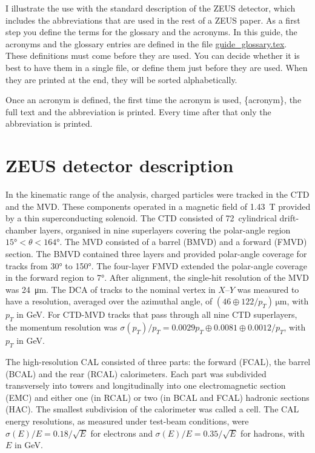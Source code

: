 I illustrate the use with the standard description of the ZEUS
detector, which includes the abbreviations that are used in the rest
of a ZEUS paper.  As a first step you define the terms for the
glossary and the acronyms.  In this guide, the acronyms and the
glossary entries are defined in the file
\url{guide_glossary.tex}. These definitions must come before
they are used. You can decide whether it is best to have them in a
single file, or define them just before they are used. When they are
printed at the end, they will be sorted alphabetically.

Once an acronym is defined, the first time the acronym is used,
\{acronym\}, the full text and the abbreviation is
printed. Every time after that only the abbreviation is printed.

\section{ZEUS detector description}
\label{sec:app:glossary:zeus}

In the kinematic range of the analysis, charged particles were tracked
in the \gls{CTD} and the
\gls{MVD}. These components operated in a magnetic
field of \SI{1.43}{\tesla} provided by a thin superconducting solenoid. The
\gls{CTD} consisted of 72~cylindrical drift-chamber layers, organised in nine
superlayers covering the polar-angle region
$\ang{15} < \theta < \ang{164}$.
%
The \gls{MVD} consisted of a barrel (BMVD) and a forward (FMVD)
section. The BMVD contained three layers and provided polar-angle
coverage for tracks from \ang{30} to \ang{150}. The four-layer FMVD
extended the polar-angle coverage in the forward region to
\ang{7}. After alignment, the single-hit resolution of the MVD was
\SI{24}{\micro\metre}. The \gls{DCA} of tracks to the nominal vertex in
$X$--$Y$ was measured to have a resolution, averaged over the
azimuthal angle, of $(46 \oplus 122 /
  p_{T})\,\si{\micro\metre}$, with $p_{T}$ in \si{\GeV}.  For \gls{CTD}-\gls{MVD} tracks
that pass through all nine \gls{CTD} superlayers, the momentum
resolution was $\sigma(p_{T})/p_{T} = 0.0029 p_{T} \oplus 0.0081
\oplus 0.0012/p_{T}$, with $p_{T}$ in \si{\GeV}.

The high-resolution \gls{CAL} consisted of three parts: the forward
(FCAL), the barrel (BCAL) and the rear (RCAL) calorimeters. Each part
was subdivided transversely into towers and longitudinally into one
electromagnetic section (EMC) and either one (in RCAL) or two (in BCAL
and FCAL) hadronic sections (HAC). The smallest subdivision of the
calorimeter was called a cell.  The \gls{CAL} energy resolutions, as
measured under test-beam conditions, were $\sigma(E)/E=0.18/\sqrt{E}$
for electrons and $\sigma(E)/E=0.35/\sqrt{E}$ for hadrons, with $E$ in
\si{\GeV}.  \clearpage

